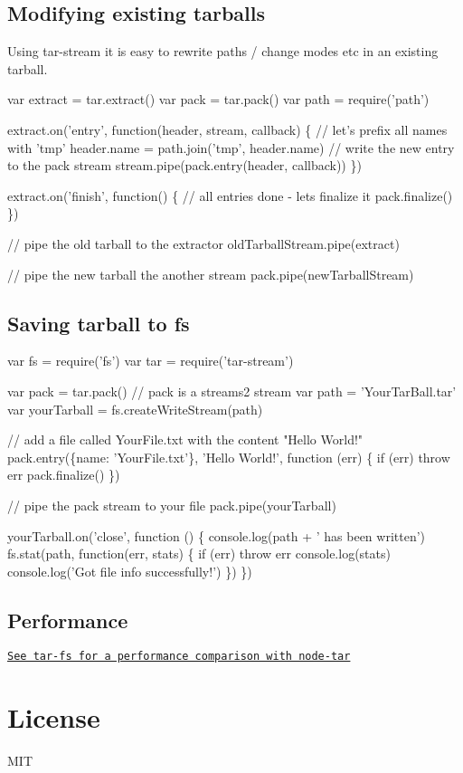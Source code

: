 \subsection*{Modifying existing tarballs}

Using tar-\/stream it is easy to rewrite paths / change modes etc in an existing tarball.


\begin{DoxyCode}
var extract = tar.extract()
var pack = tar.pack()
var path = require('path')

extract.on('entry', function(header, stream, callback) \{
  // let's prefix all names with 'tmp'
  header.name = path.join('tmp', header.name)
  // write the new entry to the pack stream
  stream.pipe(pack.entry(header, callback))
\})

extract.on('finish', function() \{
  // all entries done - lets finalize it
  pack.finalize()
\})

// pipe the old tarball to the extractor
oldTarballStream.pipe(extract)

// pipe the new tarball the another stream
pack.pipe(newTarballStream)
\end{DoxyCode}


\subsection*{Saving tarball to fs}


\begin{DoxyCode}
var fs = require('fs')
var tar = require('tar-stream')

var pack = tar.pack() // pack is a streams2 stream
var path = 'YourTarBall.tar'
var yourTarball = fs.createWriteStream(path)

// add a file called YourFile.txt with the content "Hello World!"
pack.entry(\{name: 'YourFile.txt'\}, 'Hello World!', function (err) \{
  if (err) throw err
  pack.finalize()
\})

// pipe the pack stream to your file
pack.pipe(yourTarball)

yourTarball.on('close', function () \{
  console.log(path + ' has been written')
  fs.stat(path, function(err, stats) \{
    if (err) throw err
    console.log(stats)
    console.log('Got file info successfully!')
  \})
\})
\end{DoxyCode}


\subsection*{Performance}

\href{https://github.com/mafintosh/tar-fs/blob/master/README.md#performance}{\tt See tar-\/fs for a performance comparison with node-\/tar}

\section*{License}

M\+IT 